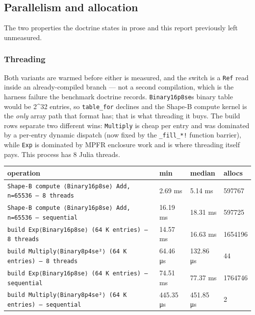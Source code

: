 \subsection{Parallelism and allocation}



\label{197555801045686935}{}


The two properties the doctrine states in prose and this report previously left unmeasured.



\subsubsection{Threading}



\label{1114263727795999607}{}


Both variants are warmed before either is measured, and the switch is a \texttt{Ref} read inside an already-compiled branch — not a second compilation, which is the harness failure the benchmark doctrine records. \texttt{Binary16p8se}{\textquotesingle}s binary table would be 2{\textasciicircum}32 entries, so \texttt{table\_\allowbreak{}for} declines and the Shape-B compute kernel is the \emph{only} array path that format has; that is what threading it buys. The build rows separate two different wins: \texttt{Multiply} is cheap per entry and was dominated by a per-entry dynamic dispatch (now fixed by the \texttt{\_\allowbreak{}fill\_\allowbreak{}*!} function barrier), while \texttt{Exp} is dominated by MPFR enclosure work and is where threading itself pays. This process has 8 Julia threads.




\begin{table}[h]
\centering
\begin{tabulary}{\linewidth}{L L L L}
\toprule
operation & min & median & allocs \\
\toprule
\texttt{Shape-B compute ⟨Binary16p8se⟩ Add, n=65536 — 8 threads} & 2.69 ms & 5.14 ms & 597767 \\
\texttt{Shape-B compute ⟨Binary16p8se⟩ Add, n=65536 — sequential} & 16.19 ms & 18.31 ms & 597725 \\
\texttt{build Exp⟨Binary16p8se⟩ (\allowbreak{}64 K entries) — 8 threads} & 14.57 ms & 16.63 ms & 1654196 \\
\texttt{build Multiply⟨Binary8p4se²⟩ (\allowbreak{}64 K entries) — 8 threads} & 64.46 μs & 132.86 μs & 44 \\
\texttt{build Exp⟨Binary16p8se⟩ (\allowbreak{}64 K entries) — sequential} & 74.51 ms & 77.37 ms & 1764746 \\
\texttt{build Multiply⟨Binary8p4se²⟩ (\allowbreak{}64 K entries) — sequential} & 445.35 μs & 451.85 μs & 2 \\
\bottomrule
\end{tabulary}

\end{table}




